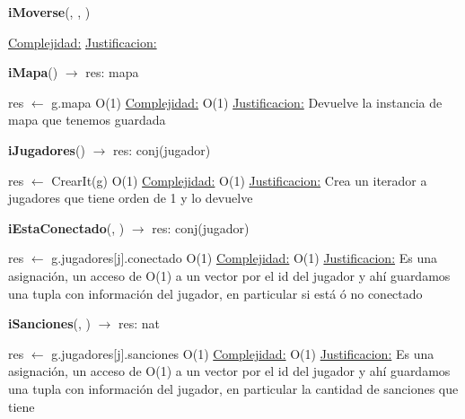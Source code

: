 \begin{Algoritmos}
\begin{algorithm}[H]{\textbf{iMoverse}(, , )}
\begin{algorithmic}[1]
		\medskip
		\Statex \underline{Complejidad:} 
		\Statex \underline{Justificacion:}
	\end{algorithmic}
\end{algorithm}


\begin{algorithm}[H]{\textbf{iMapa}() $\to$ res: mapa}
	\begin{algorithmic}[1]
		\State res $\gets$ g.mapa \Comment O(1)
		\medskip
		\Statex \underline{Complejidad:} O(1)
		\Statex \underline{Justificacion:} Devuelve la instancia de mapa que tenemos guardada
	\end{algorithmic}
\end{algorithm}

\begin{algorithm}[H]{\textbf{iJugadores}() $\to$ res: conj(jugador)}
	\begin{algorithmic}[1]
		\State res $\gets$ CrearIt(g) \Comment O(1)
		\medskip
		\Statex \underline{Complejidad:} O(1)
		\Statex \underline{Justificacion:} Crea un iterador a jugadores que tiene orden de 1 y lo devuelve
	\end{algorithmic}
\end{algorithm}

\begin{algorithm}[H]{\textbf{iEstaConectado}(, ) $\to$ res: conj(jugador)}
	\begin{algorithmic}[1]
		\State res $\gets$ g.jugadores[j].conectado \Comment O(1)
		\medskip
		\Statex \underline{Complejidad:} O(1)
		\Statex \underline{Justificacion:} Es una asignaci\'on, un acceso de O(1) a un vector por el id del jugador y ah\'i guardamos una tupla con informaci\'on del jugador, en particular si est\'a \'o no conectado
	\end{algorithmic}
\end{algorithm}

\begin{algorithm}[H]{\textbf{iSanciones}(, ) $\to$ res: nat}
	\begin{algorithmic}[1]
		\State res $\gets$ g.jugadores[j].sanciones \Comment O(1)
		\medskip
		\Statex \underline{Complejidad:} O(1)
		\Statex \underline{Justificacion:} Es una asignaci\'on, un acceso de O(1) a un vector por el id del jugador y ah\'i guardamos una tupla con informaci\'on del jugador, en particular la cantidad de sanciones que tiene
	\end{algorithmic}
\end{algorithm}


\end{Algoritmos}
